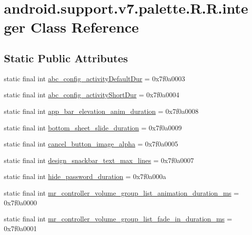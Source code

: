 \hypertarget{classandroid_1_1support_1_1v7_1_1palette_1_1_r_1_1integer}{
\section{android.support.v7.palette.R.R.integer Class Reference}
\label{classandroid_1_1support_1_1v7_1_1palette_1_1_r_1_1integer}
}
\subsection*{Static Public Attributes}
\begin{CompactItemize}
\item 
static final int \hyperlink{classandroid_1_1support_1_1v7_1_1palette_1_1_r_1_1integer_b1f70aa031b84aef647cf23dbf58f075}{abc\_\-config\_\-activityDefaultDur} = 0x7f0a0003
\item 
static final int \hyperlink{classandroid_1_1support_1_1v7_1_1palette_1_1_r_1_1integer_cc7d7cc21e41aaa1beefcc10ff5d8df8}{abc\_\-config\_\-activityShortDur} = 0x7f0a0004
\item 
static final int \hyperlink{classandroid_1_1support_1_1v7_1_1palette_1_1_r_1_1integer_0e05107e8d57a5509506c32f837894fd}{app\_\-bar\_\-elevation\_\-anim\_\-duration} = 0x7f0a0008
\item 
static final int \hyperlink{classandroid_1_1support_1_1v7_1_1palette_1_1_r_1_1integer_0651aa859823151e936c3ea714bc39be}{bottom\_\-sheet\_\-slide\_\-duration} = 0x7f0a0009
\item 
static final int \hyperlink{classandroid_1_1support_1_1v7_1_1palette_1_1_r_1_1integer_a8fa967ef85b007e07f298fe0d518446}{cancel\_\-button\_\-image\_\-alpha} = 0x7f0a0005
\item 
static final int \hyperlink{classandroid_1_1support_1_1v7_1_1palette_1_1_r_1_1integer_edb24b19809c73cd26d75f3600144116}{design\_\-snackbar\_\-text\_\-max\_\-lines} = 0x7f0a0007
\item 
static final int \hyperlink{classandroid_1_1support_1_1v7_1_1palette_1_1_r_1_1integer_31701c111a2b24b90db6a8040588675e}{hide\_\-password\_\-duration} = 0x7f0a000a
\item 
static final int \hyperlink{classandroid_1_1support_1_1v7_1_1palette_1_1_r_1_1integer_84ed328a3ce608debc64ac1e1f27c7b1}{mr\_\-controller\_\-volume\_\-group\_\-list\_\-animation\_\-duration\_\-ms} = 0x7f0a0000
\item 
static final int \hyperlink{classandroid_1_1support_1_1v7_1_1palette_1_1_r_1_1integer_ae91d6cd39fc1070f89fd686c65165cd}{mr\_\-controller\_\-volume\_\-group\_\-list\_\-fade\_\-in\_\-duration\_\-ms} = 0x7f0a0001

\end{CompactItemize}
